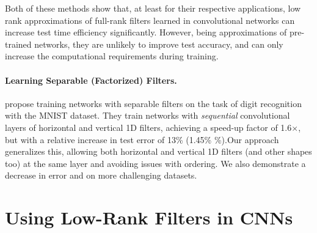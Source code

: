 \documentclass[thesis]{subfiles}
\begin{document}
    Both of these methods show that, at least for their respective applications, low rank approximations of full-rank filters learned in convolutional networks can increase test time efficiency significantly. However, being approximations of pre-trained networks, they are unlikely to improve test accuracy, and can only increase the computational requirements during training.
    
    \paragraph{Learning Separable (Factorized) Filters.}
    \label{factorized}
    \citet{mamalet2012simplifying} propose training networks with separable filters on the task of digit recognition with the MNIST dataset. They train networks with \emph{sequential} convolutional layers of horizontal and vertical 1D filters, achieving a speed-up factor of 1.6$\times$, but with a relative increase in test error of 13\% (1.45\% \%).Our approach generalizes this, allowing both horizontal and vertical 1D filters (and other shapes too) at the same layer and avoiding issues with ordering.  We also demonstrate a decrease in error and on more challenging datasets.
    
    
    \section{Using Low-Rank Filters in CNNs}
    
\end{document}
